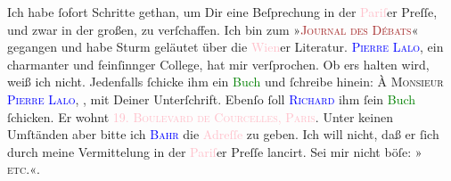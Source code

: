 \pstart
           Ich habe ſofort Schritte gethan, um Dir eine Beſprechung in der \textcolor{pink}{Pariſ}{}\ledrightnote{\textcolor{pink}{Paris}}er Preſſe, und zwar in der großen, zu verſchaffen. Ich bin
               zum »\textsc{\textcolor{brown}{Journal des Débats}{}\ledrightnote{\textcolor{brown}{Journal des débats}}}« gegangen und habe Sturm geläutet über die \textcolor{pink}{Wien}{}\ledrightnote{\textcolor{pink}{Wien}}er Literatur. \textsc{\textcolor{blue}{Pierre Lalo}{}\ledrightnote{\textcolor{blue}{Pierre Lalo}}}, ein charmanter und feinſinnger College, hat mir \label{K_L02622-2v}\label{K_L02622-2h} verſprochen.
               Ob ers halten {\pb}wird, weiß ich nicht. Jedenfalls
               ſchicke ihm ein \textcolor{green}{Buch}{}\ledrightnote{{$\rightarrow$}\textcolor{green}{Sterben. Novelle}} und
               ſchreibe hinein: \textsc{À Monsieur \textcolor{blue}{Pierre Lalo}{}\ledrightnote{\textcolor{blue}{Pierre Lalo}}}, \textsc{\label{K_L02622-3v}\label{K_L02622-3h}}, mit Deiner Unterſchrift. Ebenſo ſoll \textsc{\textcolor{blue}{Richard}{}\ledrightnote{\textcolor{blue}{Richard Beer-Hofmann}}} ihm ſein \textcolor{green}{Buch}{}\ledrightnote{{$\rightarrow$}\textcolor{green}{Novellen}} ſchicken.
               Er wohnt \textsc{\textcolor{pink}{19. Boulevard de Courcelles, Paris}{}\ledrightnote{\textcolor{pink}{Boulevard de Courcelles}}}. Unter keinen Umſtänden aber bitte ich \textsc{\textcolor{blue}{Bahr}{}\ledrightnote{\textcolor{blue}{Hermann Bahr}}} die \textcolor{pink}{Adreſſe}{}\ledrightnote{{$\rightarrow$}\textcolor{pink}{Boulevard de Courcelles}} zu geben.
               Ich will nicht, daß er ſich durch meine Vermittelung in der \textcolor{pink}{Pariſ}{}\ledrightnote{\textcolor{pink}{Paris}}er Preſſe lancirt. Sei mir nicht böſe: »\label{K_L02622-4v}\label{K_L02622-4h}{ }\textsc{etc.}«.\pend
           
